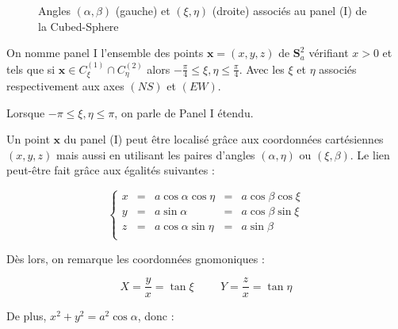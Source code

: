 \begin{figure}
\begin{center}
\caption{Angles $(\alpha, \beta)$ (gauche) et $(\xi,\eta)$ (droite) associés au panel (I) de la Cubed-Sphere}
\label{fig:coord cs}
\end{center}
\end{figure}


\begin{definition}
On nomme panel I l'ensemble des points $\mathbf{x}=(x,y,z)$ de $\mathbf{S}_a^2$ vérifiant $x>0$ et tels que si $\mathbf{x} \in C_{\xi}^{(1)} \cap C_{\eta}^{(2)}$ alors $-\frac{\pi}{4}\leq \xi,\eta \leq \frac{\pi}{4}$. Avec les $\xi$ et $\eta$ associés respectivement aux axes $(NS)$ et $(EW)$.

Lorsque $-\pi \leq \xi,\eta \leq \pi$, on parle de Panel I étendu.
\end{definition}

Un point $\mathbf{x}$ du panel (I) peut être localisé grâce aux coordonnées cartésiennes $(x,y,z)$ mais aussi en utilisant les paires d'angles $(\alpha, \eta)$ ou $(\xi, \beta)$. Le lien peut-être fait grâce aux égalités suivantes :

\begin{equation}
\left\lbrace
\begin{array}{rcccc}
x & = & a \cos \alpha \cos \eta & = & a \cos \beta \cos \xi \\
y & = & a \sin \alpha & = & a \cos \beta \sin \xi \\
z & = & a \cos \alpha \sin \eta & = & a \sin \beta \\
\end{array}
\right.
\end{equation}

Dès lors, on remarque les coordonnées gnomoniques :

\begin{equation}
X=\dfrac{y}{x}=\tan \xi \hspace{1cm} Y = \dfrac{z}{x} = \tan \eta
\end{equation}

De plus, $x^2+y^2=a^2 \cos \alpha$, donc :

